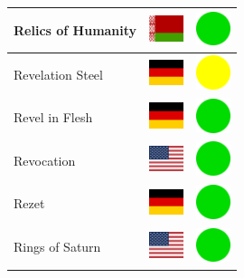 \documentclass[12pt, a4paper, twoside]{report}
\begin{document}
\begin{center}
\begin{longtable}{|p{5cm}|p{2cm}|p{2cm}|}
Relics of Humanity & \includegraphics[width=1cm]{4x3/by} & \includegraphics[width=1cm]{likes/y} \\ \hline
Revelation Steel & \includegraphics[width=1cm]{4x3/de} & \includegraphics[width=1cm]{likes/m} \\ \hline
Revel in Flesh & \includegraphics[width=1cm]{4x3/de} & \includegraphics[width=1cm]{likes/y} \\ \hline
Revocation & \includegraphics[width=1cm]{4x3/us} & \includegraphics[width=1cm]{likes/y} \\ \hline
Rezet & \includegraphics[width=1cm]{4x3/de} & \includegraphics[width=1cm]{likes/y} \\ \hline
Rings of Saturn & \includegraphics[width=1cm]{4x3/us} & \includegraphics[width=1cm]{likes/y} \\ \hline

\end{longtable}
\end{center}
\end{document}
